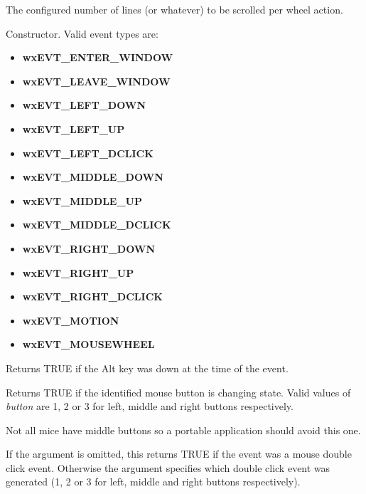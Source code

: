 

The configured number of lines (or whatever) to be scrolled per wheel
action.




Constructor. Valid event types are:

\begin{itemize}
\itemsep=0pt
\item {\bf wxEVT\_ENTER\_WINDOW}
\item {\bf wxEVT\_LEAVE\_WINDOW}
\item {\bf wxEVT\_LEFT\_DOWN}
\item {\bf wxEVT\_LEFT\_UP}
\item {\bf wxEVT\_LEFT\_DCLICK}
\item {\bf wxEVT\_MIDDLE\_DOWN}
\item {\bf wxEVT\_MIDDLE\_UP}
\item {\bf wxEVT\_MIDDLE\_DCLICK}
\item {\bf wxEVT\_RIGHT\_DOWN}
\item {\bf wxEVT\_RIGHT\_UP}
\item {\bf wxEVT\_RIGHT\_DCLICK}
\item {\bf wxEVT\_MOTION}
\item {\bf wxEVT\_MOUSEWHEEL}
\end{itemize}



Returns TRUE if the Alt key was down at the time of the event.



Returns TRUE if the identified mouse button is changing state. Valid
values of {\it button} are 1, 2 or 3 for left, middle and right
buttons respectively.

Not all mice have middle buttons so a portable application should avoid
this one.

\label{buttondclick}


If the argument is omitted, this returns TRUE if the event was a mouse
double click event. Otherwise the argument specifies which double click event
was generated (1, 2 or 3 for left, middle and right buttons respectively).

